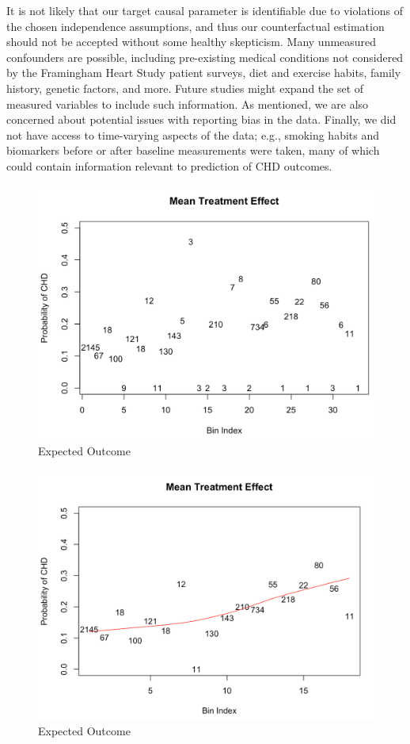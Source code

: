 \documentclass[]{article}
\begin{document}
It is not likely that our target causal parameter is identifiable due to
violations of the chosen independence assumptions, and thus our
counterfactual estimation should not be accepted without some healthy
skepticism. Many unmeasured confounders are possible, including
pre-existing medical conditions not considered by the Framingham Heart
Study patient surveys, diet and exercise habits, family history, genetic
factors, and more. Future studies might expand the set of measured
variables to include such information. As mentioned, we are also
concerned about potential issues with reporting bias in the data.
Finally, we did not have access to time-varying aspects of the data;
e.g., smoking habits and biomarkers before or after baseline
measurements were taken, many of which could contain information
relevant to prediction of CHD outcomes.

\begin{figure}[H]

{\centering \includegraphics[width=0.5\linewidth]{./effect} 

}

\caption{Expected Outcome}\label{fig:fig5}
\end{figure}

\begin{figure}[H]

{\centering \includegraphics[width=0.5\linewidth]{./pos_violation2} 

}

\caption{Expected Outcome}\label{fig:fig6}
\end{figure}
\end{document}
